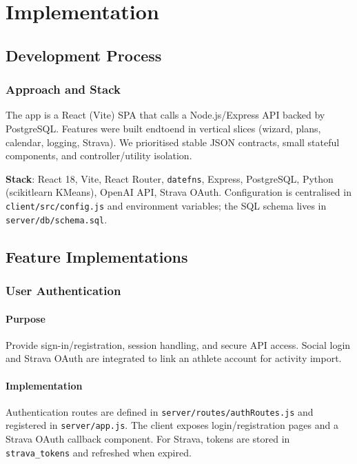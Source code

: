 \chapter{Implementation}

\section{Development Process}
\subsection{Approach and Stack}
The app is a React (Vite) SPA that calls a Node.js/Express API backed by PostgreSQL. Features were built end\-to\-end in vertical slices (wizard, plans, calendar, logging, Strava). We prioritised stable JSON contracts, small stateful components, and controller/utility isolation.

\textbf{Stack}: React 18, Vite, React Router, \texttt{date\-fns}, Express, PostgreSQL, Python (scikit\-learn KMeans), OpenAI API, Strava OAuth. Configuration is centralised in \verb|client/src/config.js| and environment variables; the SQL schema lives in \verb|server/db/schema.sql|.

\section{Feature Implementations}
\subsection{User Authentication}
\subsubsection{Purpose}
Provide sign-in/registration, session handling, and secure API access. Social login and Strava OAuth are integrated to link an athlete account for activity import.

\subsubsection{Implementation}
Authentication routes are defined in \verb|server/routes/authRoutes.js| and registered in \verb|server/app.js|. The client exposes login/registration pages and a Strava OAuth callback component. For Strava, tokens are stored in \verb|strava_tokens| and refreshed when expired.

